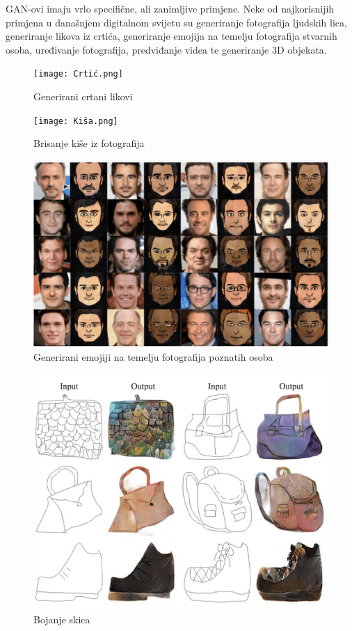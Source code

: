 \documentclass[times, utf8, diplomski]{fer}
\begin{document}
GAN-ovi imaju vrlo specifične, ali zanimljive primjene. Neke od najkorisnijih primjena u današnjem digitalnom svijetu su generiranje fotografija ljudskih lica, generiranje likova iz crtića, generiranje emojija na temelju fotografija stvarnih osoba, uređivanje fotografija, predviđanje videa te generiranje 3D objekata. \cite{slika2}

\begin{figure}[h]
\centering
\texttt{[image: Crtić.png]}
\caption{Generirani crtani likovi \cite{slika2}}
\end{figure}

\begin{figure}[h]
\centering
\texttt{[image: Kiša.png]}
\caption{Brisanje kiše iz fotografija \cite{slika2}}
\end{figure}

\begin{figure}[h]
\centering
\includegraphics[scale=0.58]{Emoji.png}
\caption{Generirani emojiji na temelju fotografija poznatih osoba \cite{slika2}}
\end{figure}

\begin{figure}[h]
\centering
\includegraphics[scale=0.58]{Bojanje.png}
\caption{Bojanje skica \cite{slika2}}
\end{figure}
\end{document}
